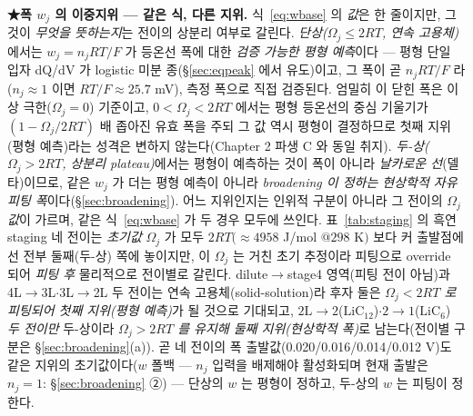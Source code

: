 \documentclass[11pt,a4paper]{article}
\begin{document}
\textbf{★폭 $w_j$ 의 이중지위 — 같은 식, 다른 지위.} 식~\eqref{eq:wbase} 의 \emph{값}은 한 줄이지만, 그것이
\emph{무엇을 뜻하는지}는 전이의 상분리 여부로 갈린다. \emph{단상($\Omega_j\le2RT$, 연속 고용체)}에서는 $w_j=n_jRT/F$
가 등온선 폭에 대한 \emph{검증 가능한 평형 예측}이다 — 평형 단일 입자 dQ/dV 가 logistic
미분 종(\S\ref{sec:eqpeak} 에서 유도)이고, 그 폭이 곧 $n_jRT/F$ 라($n_j\!\approx\!1$ 이면 $RT/F\!\approx\!25.7$ mV), 측정 폭으로 직접 검증된다. 엄밀히 이 닫힌 폭은 이상 극한($\Omega_j=0$) 기준이고,
$0<\Omega_j<2RT$ 에서는 평형 등온선의 중심 기울기가 $(1-\Omega_j/2RT)$ 배 좁아진 유효 폭을 주되 그
값 역시 평형이 결정하므로 첫째 지위(평형 예측)라는 성격은 변하지 않는다(Chapter 2 파생 C 와 동일 취지).
\emph{두-상($\Omega_j>2RT$, 상분리 plateau)}에서는 평형이 예측하는 것이 폭이 아니라 \emph{날카로운 선}(델타)이므로,
같은 $w_j$ 가 더는 평형 예측이 아니라 \emph{broadening 이 정하는 현상학적 자유 피팅 폭}이다(\S\ref{sec:broadening}).
어느 지위인지는 인위적 구분이 아니라 그 전이의 \emph{$\Omega_j$ 값}이 가르며, 같은 식~\eqref{eq:wbase} 가 두 경우 모두에
쓰인다. 표~\ref{tab:staging} 의 흑연 staging 네 전이는 \emph{초기값} $\Omega_j$ 가 모두 $2RT(\!\approx\!4958$ J/mol
$@298$ K$)$ 보다 커 출발점에선 전부 둘째(두-상) 쪽에 놓이지만, 이 $\Omega_j$ 는 거친 초기 추정이라 피팅으로
override 되어 \emph{피팅 후} 물리적으로 전이별로 갈린다. dilute$\to$stage4 영역(피팅 전이 아님)과
4L$\to$3L$\cdot$3L$\to$2L 두 전이는
연속 고용체(solid-solution)라 후자 둘은 \emph{$\Omega_j<2RT$ 로 피팅되어 첫째 지위(평형 예측)}가 될 것으로 기대되고,
$2\mathrm L\!\to\!2$($\mathrm{LiC_{12}}$)$\cdot$$2\!\to\!1$($\mathrm{LiC_6}$) \emph{두 전이만} 두-상이라
\emph{$\Omega_j>2RT$ 를 유지해 둘째 지위(현상학적 폭)}로 남는다(전이별 구분은 \S\ref{sec:broadening}(a)).
곧 네 전이의 폭 출발값(0.020/0.016/0.014/0.012 V)도 같은 지위의 초기값이다($w$ 폴백 — $n_j$ 입력을
배제해야 활성화되며 현재 출발은 $n_j{=}1$: \S\ref{sec:broadening} ②) — 단상의 $w$ 는 평형이
정하고, 두-상의 $w$ 는 피팅이 정한다.
\end{document}
